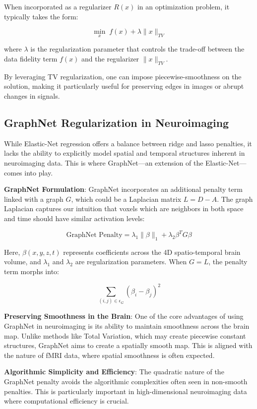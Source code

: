 When incorporated as a regularizer \( R(x) \) in an optimization problem, it typically takes the form:

\[
\min_{x} \; f(x) + \lambda \| x \|_{TV}
\]

where \( \lambda \) is the regularization parameter that controls the trade-off between the data fidelity term \( f(x) \) and the regularizer \( \| x \|_{TV} \).

By leveraging TV regularization, one can impose piecewise-smoothness on the solution, making it particularly useful for preserving edges in images or abrupt changes in signals.

\subsection{GraphNet Regularization in Neuroimaging}

While Elastic-Net regression offers a balance between ridge and lasso penalties, it lacks the ability to explicitly model spatial and temporal structures inherent in neuroimaging data.
This is where GraphNet—an extension of the Elastic-Net—comes into play.

\textbf{GraphNet Formulation}: GraphNet incorporates an additional penalty term linked with a graph \(G\), which could be a Laplacian matrix \(L = D - A\).
The graph Laplacian captures our intuition that voxels which are neighbors in both space and time should have similar activation levels:

\[
\text{GraphNet Penalty} = \lambda_{1} \lVert \beta \rVert_{1} + \lambda_{2} \beta^T G \beta
\]

Here, \(\beta(x, y, z, t)\) represents coefficients across the 4D spatio-temporal brain volume, and \(\lambda_{1}\) and \(\lambda_{2}\) are regularization parameters. When \(G = L\), the penalty term morphs into:

\[
\sum_{(i, j) \in \epsilon_{G}} (\beta_{i} - \beta_{j})^{2}
\]

\textbf{Preserving Smoothness in the Brain}: One of the core advantages of using GraphNet in neuroimaging is its ability to maintain smoothness across the brain map.
Unlike methods like Total Variation, which may create piecewise constant structures, GraphNet aims to create a spatially smooth map.
This is aligned with the nature of fMRI data, where spatial smoothness is often expected.

\textbf{Algorithmic Simplicity and Efficiency}: The quadratic nature of the GraphNet penalty avoids the algorithmic complexities often seen in non-smooth penalties.
This is particularly important in high-dimensional neuroimaging data where computational efficiency is crucial.

